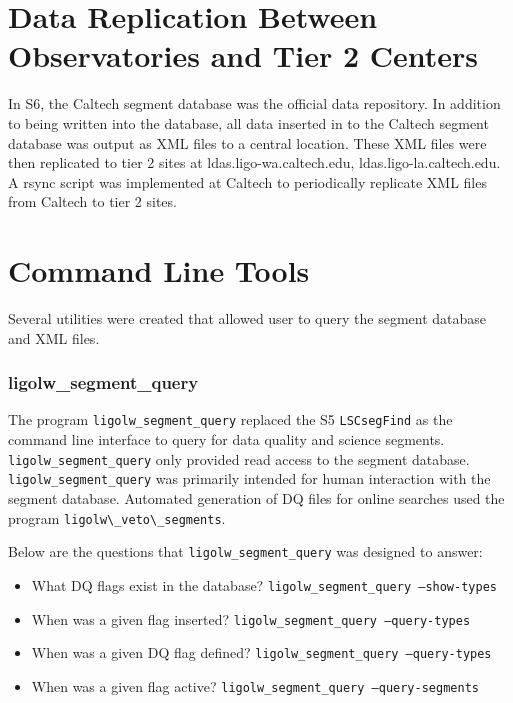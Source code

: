 \section{Data Replication Between Observatories and Tier 2 Centers}

In S6, the Caltech segment database was the official data repository.
In addition to being written into the database, all data inserted in
to the Caltech segment database was output as XML files to a
central location. These XML files were then replicated to tier 2
sites at ldas.ligo-wa.caltech.edu, ldas.ligo-la.caltech.edu. A rsync
script was implemented at Caltech to periodically replicate XML
files from Caltech to tier 2 sites.  


\section{Command Line Tools}

Several utilities were created that allowed user to query the segment
database and XML files.

\subsubsection{ligolw\_segment\_query}

The program \verb|ligolw_segment_query| replaced the S5
\verb|LSCsegFind| as the command line interface to query for data
quality and science segments.  \verb|ligolw_segment_query| only provided
read access to the segment database.  \verb|ligolw_segment_query|
was primarily intended for human interaction with the segment database.
Automated generation of DQ files for online searches used the
program \verb|ligolw\_veto\_segments|.

Below are the questions that \texttt{ligolw\_segment\_query} was
designed to answer:

\begin{itemize}
\item What DQ flags exist in the database?
\texttt{ligolw\_segment\_query --show-types}
\item When was a given flag inserted? \texttt{ligolw\_segment\_query
--query-types}
\item When was a given DQ flag defined? \texttt{ligolw\_segment\_query
--query-types}
\item When was a given flag active? \texttt{ligolw\_segment\_query
--query-segments}
\end{itemize}

